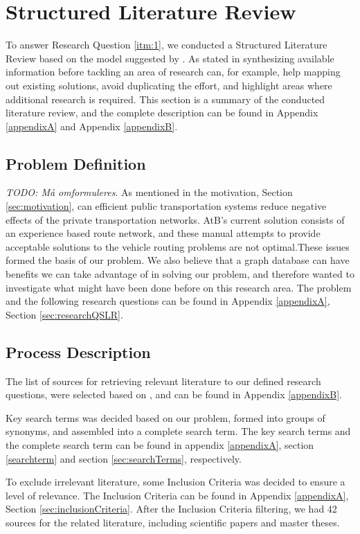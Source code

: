 \section{Structured Literature Review}
To answer Research Question \vref{itm:1}, we conducted a Structured Literature Review based on the model suggested by \citet{kofod2014}. As stated in \citep{kofod2014} synthesizing available information before tackling an area of research can, for example, help mapping out existing solutions, avoid duplicating the effort, and highlight areas where additional research is required. This section is a summary of the conducted literature review, and the complete description can be found in Appendix \vref{appendixA} and Appendix \vref{appendixB}. 

\subsection{Problem Definition}
\emph{\color{blue} TODO: Må omformuleres}. 
As mentioned in the motivation, Section \vref{sec:motivation}, can efficient public transportation systems reduce negative effects of the private transportation networks. AtB's current solution consists of an experience based route network, and these manual attempts to provide acceptable solutions to the vehicle routing problems are not optimal.These issues formed the basis of our problem. We also believe that a graph database can have benefits we can take advantage of in solving our problem, and therefore wanted to investigate what might have been done before on this research area. The problem and the following research questions can be found in Appendix \ref{appendixA}, Section \vref{sec:researchQSLR}. 

\subsection{Process Description}
The list of sources for retrieving relevant literature to our defined research questions, were selected based on \citep[p.3]{kofod2014}, and can be found in Appendix \vref{appendixB}. 

Key search terms was decided based on our problem, formed into groups of synonyms, and assembled into a complete search term. The key search terms and the complete search term can be found in appendix \ref{appendixA}, section \vref{searchterm} and section \vref{sec:searchTerms}, respectively.

To exclude irrelevant literature, some Inclusion Criteria was decided to ensure a level of relevance. The Inclusion Criteria can be found in Appendix \ref{appendixA}, Section \vref{sec:inclusionCriteria}. After the Inclusion Criteria filtering, we had 42 sources for the related literature, including scientific papers and master theses. 

